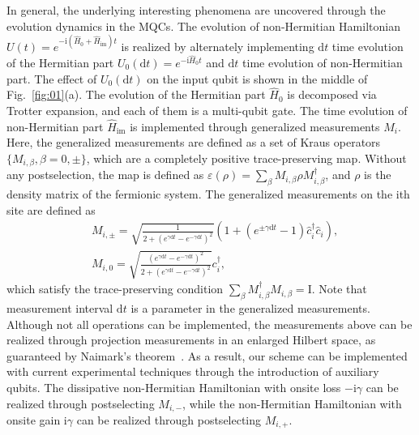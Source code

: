 \documentclass[longbibliography, aps, prx, amsmath, amssymb, amsfonts, twocolumn,superscriptaddress, footinbib]{revtex4-1}
\begin{document}
	In general, the underlying interesting phenomena are uncovered through the evolution dynamics in the MQCs. The evolution of non-Hermitian Hamiltonian $U(t) = e^{-\mathrm{i}(\hat{H}_0 + \hat{H}_{\text{im}})t}$ is realized by alternately implementing $\mathrm{d} t$ time evolution of the Hermitian part $U_0(\mathrm{d}t)=e^{-\mathrm{i}\hat{H}_0 t}$ and $\mathrm{d} t$ time evolution of non-Hermitian part. The effect of $U_0(\mathrm{d}t)$ on the input qubit is shown in the middle of Fig.~\ref{fig:01}(a).
	The evolution of the Hermitian part $\hat{H}_0$ is decomposed via Trotter expansion, and each of them is a multi-qubit gate. 
	The time evolution of non-Hermitian part $\hat{H}_{\text{im}}$ is implemented through generalized measurements $M_i$.
	Here, the generalized measurements are defined as a set of Kraus operators $\{M_{i,\beta},\beta=0,\pm \}$, which are a completely positive trace-preserving map. Without any postselection, the map is defined as
	$\varepsilon(\rho) = \sum_{\beta} M_{i, \beta} \rho M_{i, \beta}^{\dagger}$, and $\rho$ is the density matrix of the fermionic system.
	The generalized measurements on the ith site are defined as
	\begin{align}
		&M_{i,\pm} = \sqrt{\frac{1}{2+(e^{\gamma \mathrm{d} t} - e^{-\gamma \mathrm{d} t})^2}} (1 + (e^{\pm \gamma \mathrm{d} t}-1) \hat{c}_i^{\dagger} \hat{c}_i),\\
		&M_{i,0} = \sqrt{\frac{(e^{\gamma \mathrm{d} t} - e^{-\gamma \mathrm{d} t})^2}{2+(e^{\gamma \mathrm{d} t} - e^{-\gamma \mathrm{d} t})^2}} c_i^{\dagger},
	\end{align}
	which satisfy the trace-preserving condition $\sum_{\beta} M_{i,\beta}^{\dagger} M_{i,\beta}=\mathrm{I}$. 
	Note that measurement interval $\mathrm{d}t$ is a parameter in the generalized measurements. 
	Although not all operations can be implemented, the measurements above can be realized through projection measurements in an enlarged Hilbert space, as guaranteed by Naimark's theorem~\cite{coecke2008povms,nielsen2001quantum}. As a result, our scheme can be implemented with current experimental techniques through the introduction of auxiliary qubits.
	The dissipative non-Hermitian Hamiltonian with onsite loss $-\mathrm{i}\gamma$ can be realized through postselecting $M_{i,-}$, while the non-Hermitian Hamiltonian with onsite gain $\mathrm{i}\gamma$ can be realized through postselecting $M_{i,+}$. 
	
\end{document}
